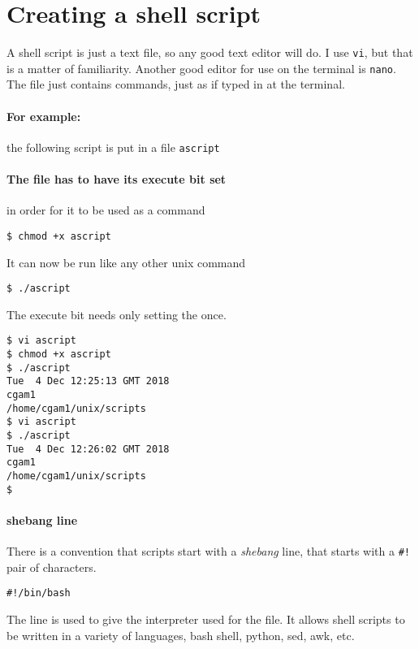 \documentclass[a4paper]{article}
\begin{document}
\section{Creating a shell script}
A shell script is just a text file, so any good text editor will do.  I use
\verb'vi', but that is a matter of familiarity.  Another good editor for use
on the terminal is \verb'nano'.  The file just contains commands, just as if typed in at the terminal.


\paragraph{For example:} the following script is put in a file \texttt{ascript}
\begin{code}[title=\texttt{ascript}]
    
  \end{code}

\paragraph{The file has to have its execute bit set } in order for it
to be used as a command
\begin{terminal}
\begin{verbatim}
$ chmod +x ascript
\end{verbatim}
\end{terminal}
It can now be run like any other unix command
\begin{terminal}
\begin{verbatim}
$ ./ascript
\end{verbatim}
\end{terminal}
The execute bit needs only setting the once.

\begin{terminal}
\begin{verbatim}
$ vi ascript
$ chmod +x ascript
$ ./ascript
Tue  4 Dec 12:25:13 GMT 2018
cgam1
/home/cgam1/unix/scripts
$ vi ascript
$ ./ascript
Tue  4 Dec 12:26:02 GMT 2018
cgam1
/home/cgam1/unix/scripts
$
\end{verbatim}
\end{terminal}

\paragraph{shebang line}
There is a convention that scripts start with a \emph{shebang} line, that
starts with a \verb'#!' pair of characters.
\begin{code}
\begin{verbatim}
#!/bin/bash
\end{verbatim}
\end{code}
The line is used to give the interpreter used for the file.  It allows shell
scripts to be written in a variety of languages, bash shell, python, sed, awk,
etc.
\end{document}
